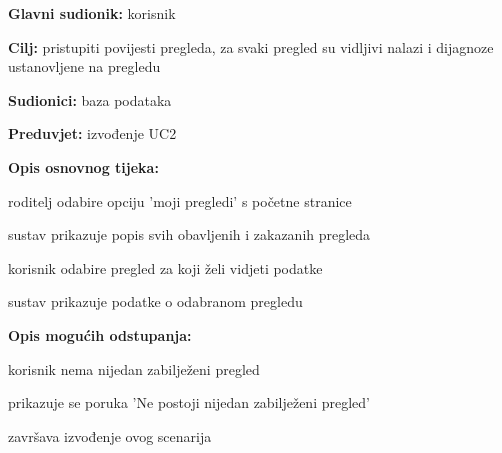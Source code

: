                      \noindent {}
					\begin{packed_item}
	
						\item \textbf{Glavni sudionik: }korisnik
						\item  \textbf{Cilj:} pristupiti povijesti pregleda, za svaki pregled su vidljivi nalazi i dijagnoze ustanovljene na pregledu
						\item  \textbf{Sudionici:} baza podataka
						\item  \textbf{Preduvjet:} izvođenje UC2
						\item  \textbf{Opis osnovnog tijeka:}
						
						\item[] \begin{packed_enum}
	
							\item roditelj odabire opciju 'moji pregledi' s početne stranice
							\item sustav prikazuje popis svih obavljenih i zakazanih pregleda
							\item korisnik odabire pregled za koji želi vidjeti podatke
							\item sustav prikazuje podatke o odabranom pregledu
							
						\end{packed_enum}
						\item  \textbf{Opis mogućih odstupanja:}
						
						\item[] \begin{packed_item}
							\item[2.a] korisnik nema nijedan zabilježeni pregled
							\item[] 
							\begin{packed_enum} 
								\item prikazuje se poruka 'Ne postoji nijedan zabilježeni pregled'
								\item završava izvođenje ovog scenarija
								
							\end{packed_enum}
						\end{packed_item}
					\end{packed_item}

